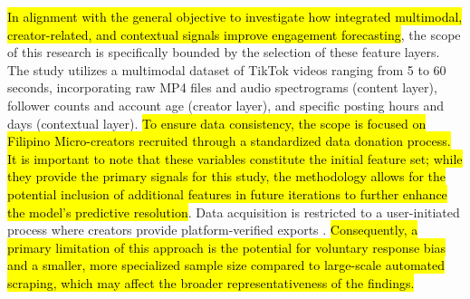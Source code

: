 


\hl{In alignment with the general objective to investigate how integrated multimodal, creator-related, and contextual signals improve engagement forecasting}, the scope of this research is specifically bounded by the selection of these feature layers. The study utilizes a multimodal dataset of TikTok videos ranging from 5 to 60 seconds, incorporating raw MP4 files and audio spectrograms (content layer), follower counts and account age (creator layer), and specific posting hours and days (contextual layer). \hl{To ensure data consistency, the scope is focused on Filipino Micro-creators recruited through a standardized data donation process.} \hl{It is important to note that these variables constitute the initial feature set; while they provide the primary signals for this study, the methodology allows for the potential inclusion of additional features in future iterations to further enhance the model's predictive resolution}. Data acquisition is restricted to a user-initiated process where creators provide platform-verified exports \cite{li2024delving}. \hl{Consequently, a primary limitation of this approach is the potential for voluntary response bias and a smaller, more specialized sample size compared to large-scale automated scraping, which may affect the broader representativeness of the findings.}

